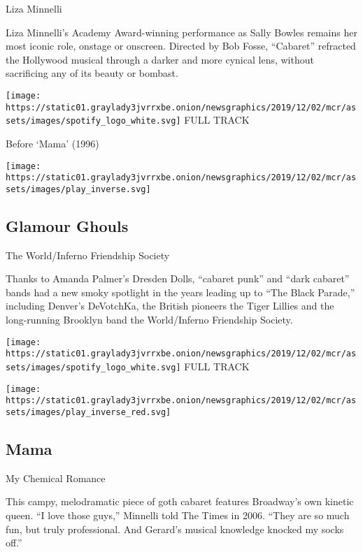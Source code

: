 Liza Minnelli

Liza Minnelli's Academy Award-winning performance as Sally Bowles
remains her most iconic role, onstage or onscreen. Directed by Bob
Fosse, ``Cabaret'' refracted the Hollywood musical through a darker and
more cynical lens, without sacrificing any of its beauty or bombast.

\href{https://open.spotify.com/track/7AFy1aN1RQVgGOXzCtrK87?si=BUcfzhG5TZKSKIJph7L0Pw}{}

\texttt{[image: https://static01.graylady3jvrrxbe.onion/newsgraphics/2019/12/02/mcr/assets/images/spotify\_logo\_white.svg]}
FULL TRACK

Before `Mama' (1996)

\texttt{[image: https://static01.graylady3jvrrxbe.onion/newsgraphics/2019/12/02/mcr/assets/images/play\_inverse.svg]}

\hypertarget{glamour-ghouls}{%
\subsection{Glamour Ghouls}\label{glamour-ghouls}}

The World/Inferno Friendship Society

Thanks to Amanda Palmer's Dresden Dolls, ``cabaret punk'' and ``dark
cabaret'' bands had a new smoky spotlight in the years leading up to
``The Black Parade,'' including Denver's DeVotchKa, the British pioneers
the Tiger Lillies and the long-running Brooklyn band the World/Inferno
Friendship Society.

\href{https://open.spotify.com/track/1CZqXNSNj1CxDOoZv2azpk?si=vUOsEoKETOiPijQFwSX8WA}{}

\texttt{[image: https://static01.graylady3jvrrxbe.onion/newsgraphics/2019/12/02/mcr/assets/images/spotify\_logo\_white.svg]}
FULL TRACK

\texttt{[image: https://static01.graylady3jvrrxbe.onion/newsgraphics/2019/12/02/mcr/assets/images/play\_inverse\_red.svg]}

\hypertarget{mama-1}{%
\subsection{Mama}\label{mama-1}}

My Chemical Romance

This campy, melodramatic piece of goth cabaret features Broadway's own
kinetic queen. ``I love those guys,'' Minnelli told The Times in 2006.
``They are so much fun, but truly professional. And Gerard's musical
knowledge knocked my socks off.''

